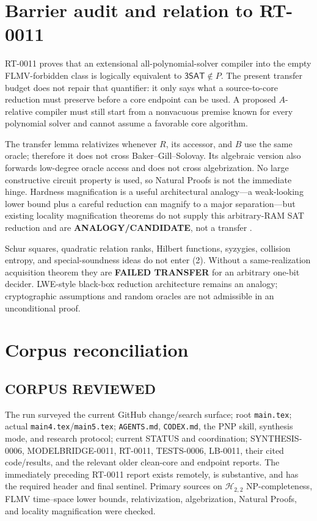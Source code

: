\documentclass[11pt]{article}
\newcommand{\SAT}{\mathsf{3SAT}}
\newcommand{\Htwo}{\mathcal H_{2,2}}
\begin{document}
\section{Barrier audit and relation to RT-0011}
RT-0011 proves that an extensional all-polynomial-solver compiler into the
empty FLMV-forbidden class is logically equivalent to $\SAT\notin P$.  The
present transfer budget does not repair that quantifier: it only says what a
source-to-core reduction must preserve before a core endpoint can be used.
A proposed $A$-relative compiler must still start from a nonvacuous premise
known for every polynomial solver and cannot assume a favorable core
algorithm.

The transfer lemma relativizes whenever $R$, its accessor, and $B$ use the
same oracle; therefore it does not cross Baker--Gill--Solovay.  Its algebraic
version also forwards low-degree oracle access and does not cross
algebrization.  No large constructive circuit property is used, so Natural
Proofs is not the immediate hinge.  Hardness magnification is a useful
architectural analogy---a weak-looking lower bound plus a careful reduction
can magnify to a major separation---but existing locality magnification
theorems do not supply this arbitrary-RAM SAT reduction and are
\textbf{ANALOGY/CANDIDATE}, not a transfer \cite{locality}.

Schur squares, quadratic relation ranks, Hilbert functions, syzygies,
collision entropy, and special-soundness ideas do not enter (2).  Without a
same-realization acquisition theorem they are \textbf{FAILED TRANSFER} for
an arbitrary one-bit decider.  LWE-style black-box reduction architecture
remains an analogy; cryptographic assumptions and random oracles are not
admissible in an unconditional proof.

\section{Corpus reconciliation}
\subsection*{CORPUS REVIEWED}
The run surveyed the current GitHub change/search surface; root
\texttt{main.tex}; actual \texttt{main4.tex}/\texttt{main5.tex};
\texttt{AGENTS.md}, \texttt{CODEX.md}, the PNP skill, synthesis mode, and
research protocol; current STATUS and coordination; SYNTHESIS-0006,
MODELBRIDGE-0011, RT-0011, TESTS-0006, LB-0011, their cited code/results,
and the relevant older clean-core and endpoint reports.  The immediately
preceding RT-0011 report exists remotely, is substantive, and has the
required header and final sentinel.  Primary sources on $\Htwo$
NP-completeness, FLMV time--space lower bounds, relativization,
algebrization, Natural Proofs, and locality magnification were checked.
\end{document}
